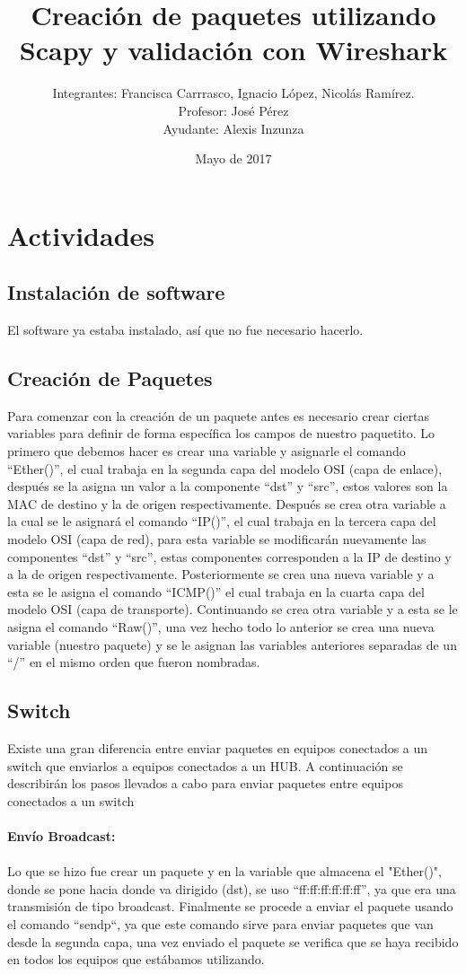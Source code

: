 \documentclass{udpreport}
\title{Creación de paquetes utilizando Scapy y validación con
Wireshark}
\author{Integrantes: Francisca Carrrasco, Ignacio López, Nicolás Ramírez.\\Profesor: José Pérez
\\Ayudante: Alexis Inzunza}
\date{Mayo de 2017}
\begin{document}
\maketitle
\tableofcontents
\listoffigures
\chapter{Actividades}
	\section{Instalación de software}
    	El software ya estaba instalado, así que no fue necesario hacerlo. \\
	\section{Creación de Paquetes}
		Para comenzar con la creación de un paquete antes es necesario crear ciertas variables para definir de forma específica los campos de nuestro paquetito. Lo primero que debemos hacer es crear una variable y asignarle el comando “Ether()”, el cual trabaja en la segunda capa del modelo OSI (capa de enlace), después se la asigna un valor a la componente “dst” y “src”, estos valores son la MAC
		de destino y la de origen respectivamente.
		Después se crea otra variable a la cual se le asignará el comando “IP()”, el cual trabaja en la tercera
		capa del modelo OSI (capa de red), para esta variable se modificarán nuevamente las componentes “dst” y “src”, estas componentes corresponden a la IP de destino y a la de origen respectivamente.
		Posteriormente se crea una nueva variable y a esta se le asigna el
		comando “ICMP()” el cual trabaja en la cuarta capa del modelo OSI (capa de transporte). Continuando se crea otra variable y a esta se le asigna el comando “Raw()”, una vez hecho todo lo anterior se crea una nueva variable (nuestro paquete)  y se le asignan las variables anteriores separadas de un “/” en el mismo orden que fueron nombradas.
		
	\section{Switch}
		Existe una gran diferencia entre enviar paquetes en equipos conectados a un switch que enviarlos a equipos conectados a un HUB. A continuación se describirán los pasos llevados a cabo para enviar paquetes entre equipos conectados a un switch\\\\
		{\bf \large Envío Broadcast:}\\\\
		Lo que se hizo fue crear un paquete y en la variable que almacena el "Ether()", donde se pone hacia donde
		va dirigido (dst), se uso “ff:ff:ff:ff:ff:ff”, ya que era una transmisión de tipo broadcast.
		Finalmente se procede a enviar el paquete usando el comando “sendp“, ya que este comando sirve para enviar paquetes que van desde la segunda capa, una vez enviado el paquete se verifica que se haya recibido en todos los equipos que estábamos utilizando.\\\\
		
\end{document}
